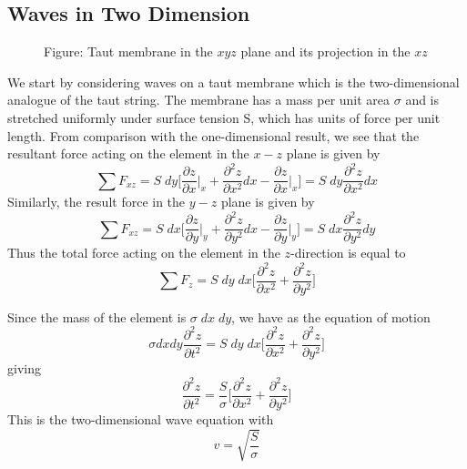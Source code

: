 \documentclass[../../../main.tex]{subfiles}
\begin{document}
\subsection{Waves in Two Dimension}
\begin{figure}
    \centering
    \caption*{Figure: Taut membrane in the $xyz$ plane and its projection in the $xz$}
\end{figure}
We start by considering waves on a taut membrane which is the two-dimensional analogue of the taut string. The membrane has a mass per unit area $\sigma$ and is stretched uniformly under surface tension S, which has units of force per unit length. From comparison with the one-dimensional result, we see that the resultant force acting on the element in the $x-z$ plane is given by
\begin{equation*}
    \sum F_{xz}=S\;dy\biggl[\frac{\partial z}{\partial x}\bigg|_x+\frac{\partial^2 z}{\partial x^2}dx-\frac{\partial z}{\partial x}\bigg|_x\biggr]=S\;dy\frac{\partial^2 z}{\partial x^2}dx
\end{equation*}
Similarly, the result force in the $y-z$ plane is given by
\begin{equation*}
    \sum F_{xz}=S\;dx\biggl[\frac{\partial z}{\partial y}\bigg|_y+\frac{\partial^2 z}{\partial y^2}dx-\frac{\partial z}{\partial y}\bigg|_y\biggr]=S\;dx\frac{\partial^2 z}{\partial y^2}dy    
\end{equation*}
Thus the total force acting on the element in the $z$-direction is equal to
\begin{equation*}
    \sum F_z=S\;dy\;dx\biggl[\frac{\partial^2 z}{\partial x^2}+\frac{\partial^2 z}{\partial y^2}\biggr]
\end{equation*}

Since the mass of the element is $\sigma\;dx\;dy$, we have as the equation of motion
\begin{equation*}
    \sigma dx dy \frac{\partial^2 z}{\partial t^2}=S\;dy\;dx\biggl[\frac{\partial^2 z}{\partial x^2}+\frac{\partial^2 z}{\partial y^2}\biggr]
\end{equation*}
giving
\begin{equation*}
    \frac{\partial^2 z}{\partial t^2}=\frac{S}{\sigma}\biggl[\frac{\partial^2 z}{\partial x^2}+\frac{\partial^2 z}{\partial y^2}\biggr]
\end{equation*}
This is the two-dimensional wave equation with
\begin{equation*}
    v=\sqrt{\frac{S}{\sigma}}
\end{equation*}
\end{document}
